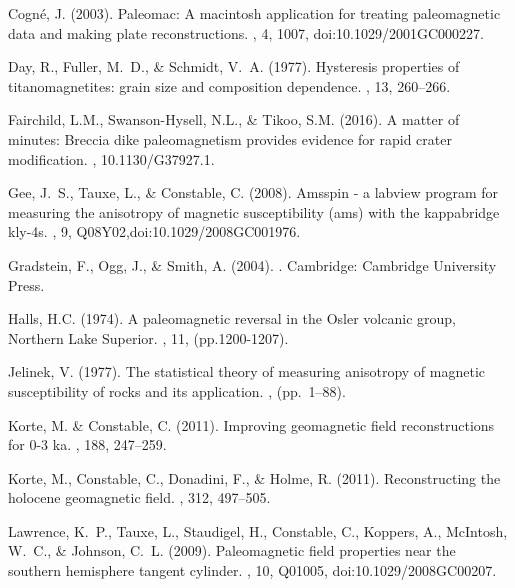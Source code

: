 \documentclass[11pt]{book}
\begin{document}
{{\begin{thebibliography}{}
Cogn\'e, J. (2003).
\newblock Paleomac: A macintosh application for treating paleomagnetic data and
  making plate reconstructions.
, 4, 1007, doi:10.1029/2001GC000227.

Day, R., Fuller, M.~D., \& Schmidt, V.~A. (1977).
\newblock Hysteresis properties of titanomagnetites: grain size and composition
  dependence.
, 13, 260--266.

Fairchild, L.M., Swanson-Hysell, N.L., \& Tikoo, S.M. (2016).
\newblock A matter of minutes: Breccia dike paleomagnetism provides evidence for rapid crater modification.
, 10.1130/G37927.1.

Gee, J.~S., Tauxe, L., \& Constable, C. (2008).
\newblock Amsspin - a labview program for measuring the anisotropy of magnetic
  susceptibility (ams) with the kappabridge kly-4s.
, 9, Q08Y02,doi:10.1029/2008GC001976.

Gradstein, F., Ogg, J., \& Smith, A. (2004).
.
\newblock Cambridge: Cambridge University Press.

Halls, H.C. (1974).
\newblock A paleomagnetic reversal in the Osler volcanic group, Northern Lake Superior.
, 11, (pp.1200-1207).

Jelinek, V. (1977).
\newblock The statistical theory of measuring anisotropy of magnetic
  susceptibility of rocks and its application.
, (pp.\ 1--88).

Korte, M. \& Constable, C. (2011).
\newblock Improving geomagnetic field reconstructions for 0-3 ka.
, 188, 247--259.

Korte, M., Constable, C., Donadini, F., \& Holme, R. (2011).
\newblock Reconstructing the holocene geomagnetic field.
, 312, 497--505.

Lawrence, K.~P., Tauxe, L., Staudigel, H., Constable, C., Koppers, A.,
  McIntosh, W.~C., \& Johnson, C.~L. (2009).
\newblock Paleomagnetic field properties near the southern hemisphere tangent
  cylinder.
, 10, Q01005,
  doi:10.1029/2008GC00207.


\end{thebibliography}}}
\end{document}
